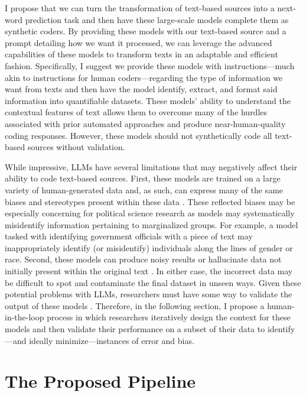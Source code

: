     I propose that we can turn the transformation of text-based sources into a next-word prediction task and then have these large-scale models complete them as synthetic coders. By providing these models with our text-based source and a prompt detailing how we want it processed, we can leverage the advanced capabilities of these models to transform texts in an adaptable and efficient fashion. Specifically, I suggest we provide these models with instructions—much akin to instructions for human coders—regarding the type of information we want from texts and then have the model identify, extract, and format said information into quantifiable datasets. These models' ability to understand the contextual features of text allows them to overcome many of the hurdles associated with prior automated approaches and produce near-human-quality coding responses. However, these models should not synthetically code all text-based sources without validation.

    While impressive, LLMs have several limitations that may negatively affect their ability to code text-based sources. First, these models are trained on a large variety of human-generated data and, as such, can express many of the same biases and stereotypes present within these data \citep{gargWordEmbeddingsQuantify2018,caliskanSemanticsDerivedAutomatically2017,benderDangersStochasticParrots2021,zhouFrequencybasedDistortionsContextualized2021}. These reflected biases may be especially concerning for political science research as models may systematically misidentify information pertaining to marginalized groups. For example, a model tasked with identifying government officials with a piece of text may inappropriately identify (or misidentify) individuals along the lines of gender or race. Second, these models can produce noisy results or hallucinate data not initially present within the original text \citep{linTruthfulQAMeasuringHow2022}. In either case, the incorrect data may be difficult to spot and contaminate the final dataset in unseen ways. Given these potential problems with LLMs, researchers must have some way to validate the output of these models \citep{grimmerTextDataPromise2013,knoxTestingCausalTheories2022}. Therefore, in the following section, I propose a human-in-the-loop process in which researchers iteratively design the context for these models and then validate their performance on a subset of their data to identify—and ideally minimize—instances of error and bias.

    \section{The Proposed Pipeline}


